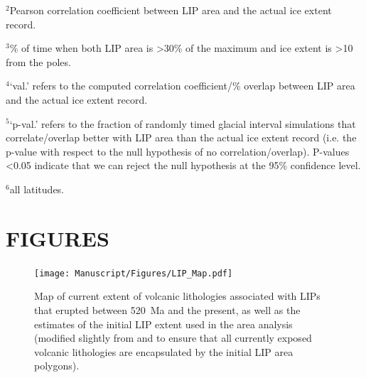 \documentclass[11pt,letterpaper]{article}
\begin{document}
\begin{table}[h!]
\begin{tablenotes}
$^{2}$Pearson correlation coefficient between LIP area and the actual ice extent record.
\vspace{0.15cm}

$^{3}$\% of time when both LIP area is \textgreater30\% of the maximum and ice extent is \textgreater10\textdegree\xspace from the poles.
\vspace{0.15cm}

$^{4}$`val.' refers to the computed correlation coefficient/\% overlap between LIP area and the actual ice extent record.
\vspace{0.15cm}

$^{5}$`p-val.' refers to the fraction of randomly timed glacial interval simulations that correlate/overlap better with LIP area than the actual ice extent record (i.e. the p-value with respect to the null hypothesis of no correlation/overlap). P-values \textless0.05 indicate that we can reject the null hypothesis at the 95\% confidence level.
\vspace{0.15cm}

$^{6}$all latitudes.
\end{tablenotes}
\label{tab:stats}
\end{table}

\clearpage
\newpage

\section*{FIGURES}

\begin{figure}[h!]
\begin{center}
	\texttt{[image: Manuscript/Figures/LIP\_Map.pdf]}
	\caption{Map of current extent of volcanic lithologies associated with LIPs that erupted between 520~Ma and the present, as well as the estimates of the initial LIP extent used in the area analysis (modified slightly from \citealp{Ernst2017a} and \citealp{Ernst2019a} to ensure that all currently exposed volcanic lithologies are encapsulated by the initial LIP area polygons).}
	\label{fig:LIP_map}
\end{center}
\end{figure}
\end{document}

